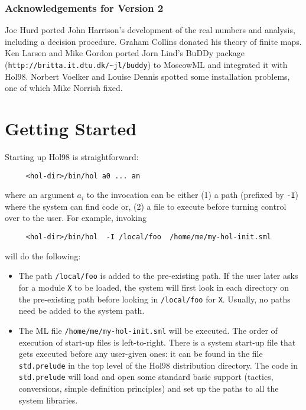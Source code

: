 \documentclass[12pt,fleqn,layout,a4paper]{report}
\begin{document}
\subsection*{Acknowledgements for Version 2}

Joe Hurd ported John Harrison's development of the real numbers and
analysis, including a decision procedure. Graham Collins donated his
theory of finite maps. Ken Larsen and Mike Gordon ported Jorn Lind's
BuDDy package (\verb+http://britta.it.dtu.dk/~jl/buddy+) to MoscowML and
integrated it with Hol98. Norbert Voelker and Louise Dennis spotted some
installation problems, one of which Mike Norrish fixed.


\tableofcontents

\chapter{Getting Started}

 Starting up Hol98 is straightforward:
 \begin{verbatim}
     <hol-dir>/bin/hol a0 ... an
 \end{verbatim}
 where an argument $a_i$ to the invocation can be either (1) a path
 (prefixed by \verb+-I+) where the system can find code or, (2) a file to
 execute before turning control over to the user. For example, invoking
 \begin{verbatim}
     <hol-dir>/bin/hol  -I /local/foo  /home/me/my-hol-init.sml
 \end{verbatim}
 will do the following:
 \begin{itemize}
 \item The path \verb+/local/foo+ is added to the pre-existing path. If
    the user later asks for a module \verb+X+ to be loaded, the system
    will first look in each directory on the pre-existing path before
    looking in \verb+/local/foo+ for \verb+X+. Usually, no paths need be
    added to the system path.

 \item The ML file \verb+/home/me/my-hol-init.sml+ will be executed. The
      order of execution of start-up files is left-to-right. There is a
      system start-up file that gets executed before any user-given ones:
      it can be found in the file \verb+std.prelude+ in the top level of the
      Hol98 distribution directory. The code in \verb+std.prelude+ will
      load and open some standard basic support (tactics, conversions,
      simple definition principles) and set up the paths to all the
      system libraries.
 \end{itemize}
\end{document}
